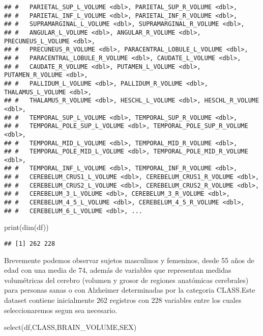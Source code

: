 \documentclass[
]{article}
\newenvironment{Shaded}{\begin{snugshade}}{\end{snugshade}}
\newcommand{\FunctionTok}[1]{\textcolor[rgb]{0.00,0.00,0.00}{#1}}
\newcommand{\NormalTok}[1]{#1}
\begin{document}
\begin{verbatim}
## #   PARIETAL_SUP_L_VOLUME <dbl>, PARIETAL_SUP_R_VOLUME <dbl>,
## #   PARIETAL_INF_L_VOLUME <dbl>, PARIETAL_INF_R_VOLUME <dbl>,
## #   SUPRAMARGINAL_L_VOLUME <dbl>, SUPRAMARGINAL_R_VOLUME <dbl>,
## #   ANGULAR_L_VOLUME <dbl>, ANGULAR_R_VOLUME <dbl>, PRECUNEUS_L_VOLUME <dbl>,
## #   PRECUNEUS_R_VOLUME <dbl>, PARACENTRAL_LOBULE_L_VOLUME <dbl>,
## #   PARACENTRAL_LOBULE_R_VOLUME <dbl>, CAUDATE_L_VOLUME <dbl>,
## #   CAUDATE_R_VOLUME <dbl>, PUTAMEN_L_VOLUME <dbl>, PUTAMEN_R_VOLUME <dbl>,
## #   PALLIDUM_L_VOLUME <dbl>, PALLIDUM_R_VOLUME <dbl>, THALAMUS_L_VOLUME <dbl>,
## #   THALAMUS_R_VOLUME <dbl>, HESCHL_L_VOLUME <dbl>, HESCHL_R_VOLUME <dbl>,
## #   TEMPORAL_SUP_L_VOLUME <dbl>, TEMPORAL_SUP_R_VOLUME <dbl>,
## #   TEMPORAL_POLE_SUP_L_VOLUME <dbl>, TEMPORAL_POLE_SUP_R_VOLUME <dbl>,
## #   TEMPORAL_MID_L_VOLUME <dbl>, TEMPORAL_MID_R_VOLUME <dbl>,
## #   TEMPORAL_POLE_MID_L_VOLUME <dbl>, TEMPORAL_POLE_MID_R_VOLUME <dbl>,
## #   TEMPORAL_INF_L_VOLUME <dbl>, TEMPORAL_INF_R_VOLUME <dbl>,
## #   CEREBELUM_CRUS1_L_VOLUME <dbl>, CEREBELUM_CRUS1_R_VOLUME <dbl>,
## #   CEREBELUM_CRUS2_L_VOLUME <dbl>, CEREBELUM_CRUS2_R_VOLUME <dbl>,
## #   CEREBELUM_3_L_VOLUME <dbl>, CEREBELUM_3_R_VOLUME <dbl>,
## #   CEREBELUM_4_5_L_VOLUME <dbl>, CEREBELUM_4_5_R_VOLUME <dbl>,
## #   CEREBELUM_6_L_VOLUME <dbl>, ...
\end{verbatim}

\begin{Shaded}
\begin{Highlighting}[]
\FunctionTok{print}\NormalTok{(}\FunctionTok{dim}\NormalTok{(df))}
\end{Highlighting}
\end{Shaded}

\begin{verbatim}
## [1] 262 228
\end{verbatim}

Brevemente podemos observar sujetos masculinos y femeninos, desde 55
años de edad con una media de 74, además de variables que representan
medidas volumétricas del cerebro (volumen y grosor de regiones
anatómicas cerebrales) para personas sanas o con Alzheimer determinadas
por la categoria CLASS.Este dataset contiene inicialmente 262 registros
con 228 variables entre los cuales seleccionaremos segun sea necesario.

\begin{Shaded}
\begin{Highlighting}[]
\FunctionTok{select}\NormalTok{(df,CLASS,BRAIN\_VOLUME,SEX)}
\end{Highlighting}
\end{Shaded}
\end{document}
